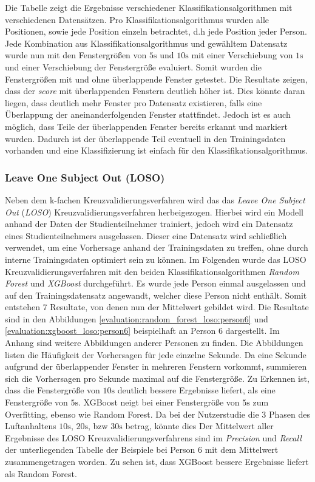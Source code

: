 Die Tabelle zeigt die Ergebnisse verschiedener Klassifikationsalgorithmen mit verschiedenen Datensätzen.
Pro Klassifikationsalgorithmus wurden alle Positionen, sowie jede Position einzeln betrachtet, d.h jede Position jeder Person.
Jede Kombination aus Klassifikationsalgorithmus und gewähltem Datensatz wurde nun mit den Fenstergrößen von $5\si{\s}$ und $10\si{\s}$ mit einer Verschiebung von $1\si{\s}$ und einer Verschiebung der Fenstergröße evaluiert.
Somit wurden die Fenstergrößen mit und ohne überlappende Fenster getestet.
Die Resultate zeigen, dass der \textit{score} mit überlappenden Fenstern deutlich höher ist.
Dies könnte daran liegen, dass deutlich mehr Fenster pro Datensatz existieren, falls eine Überlappung der aneinanderfolgenden Fenster stattfindet.
Jedoch ist es auch möglich, dass Teile der überlappenden Fenster bereits erkannt und markiert wurden.
Dadurch ist der überlappende Teil eventuell in den Trainingsdaten vorhanden und eine Klassifizierung ist einfach für den Klassifikationsalgorithmus.

\subsubsection{Leave One Subject Out (LOSO)}
Neben dem k-fachen Kreuzvalidierungsverfahren wird das das \textit{Leave One Subject Out} (\textit{LOSO}) Kreuzvalidierungsverfahren herbeigezogen. 
Hierbei wird ein Modell anhand der Daten der Studienteilnehmer trainiert, jedoch wird ein Datensatz eines Studienteilnehmers ausgelassen. 
Dieser eine Datensatz wird schließlich verwendet, um eine Vorhersage anhand der Trainingsdaten zu treffen, ohne durch interne Trainingsdaten optimiert sein zu können.
Im Folgenden wurde das LOSO Kreuzvalidierungsverfahren mit den beiden Klassifikationsalgorithmen \textit{Random Forest} und \textit{XGBoost} durchgeführt. 
Es wurde jede Person einmal ausgelassen und auf den Trainingsdatensatz angewandt, welcher diese Person nicht enthält. 
Somit entstehen 7 Resultate, von denen nun der Mittelwert gebildet wird.
Die Resultate sind in den Abbildungen \ref{evaluation:random_forest_loso:person6} und \ref{evaluation:xgboost_loso:person6} beispielhaft an Person 6 dargestellt.
Im Anhang sind weitere Abbildungen anderer Personen zu finden.
Die Abbildungen listen die Häufigkeit der Vorhersagen für jede einzelne Sekunde. 
Da eine Sekunde aufgrund der überlappender Fenster in mehreren Fenstern vorkommt, summieren sich die Vorhersagen pro Sekunde maximal auf die Fenstergröße.
Zu Erkennen ist, dass die Fenstergröße von $10\si{\s}$ deutlich bessere Ergebnisse liefert, als eine Fenstergröße von $5\si{\s}$. 
XGBoost neigt bei einer Fenstergröße von $5\si{\s}$ zum Overfitting, ebenso wie Random Forest. 
Da bei der Nutzerstudie die 3 Phasen des Luftanhaltens $10\si{\s}$, $20\si{\s}$, bzw $30\si{\s}$ betrag, könnte dies 
Der Mittelwert aller Ergebnisse des LOSO Kreuzvalidierungsverfahrens sind im \textit{Precision} und \textit{Recall} der unterliegenden Tabelle der Beispiele bei Person 6 mit dem Mittelwert zusammengetragen worden. 
Zu sehen ist, dass XGBoost bessere Ergebnisse liefert als Random Forest.

